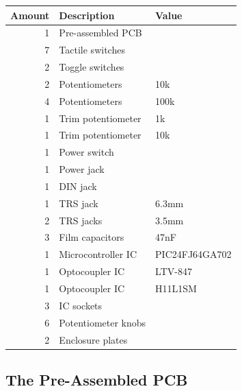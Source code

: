 \documentclass{scrartcl}
\begin{document}
\begin{center}
    \begin{tabular}{|r|l|l|}
        \hline
        \textbf{Amount} & \textbf{Description} & \textbf{Value} \\
        \hline
        1               & Pre-assembled PCB    &                \\
        7               & Tactile switches     &                \\
        2               & Toggle switches      &                \\
        2               & Potentiometers       & 10k            \\
        4               & Potentiometers       & 100k           \\
        1               & Trim potentiometer   & 1k             \\
        1               & Trim potentiometer   & 10k            \\
        1               & Power switch         &                \\
        1               & Power jack           &                \\
        1               & DIN jack             &                \\
        1               & TRS jack             & 6.3mm          \\
        2               & TRS jacks            & 3.5mm          \\
        3               & Film capacitors      & 47nF           \\
        1               & Microcontroller IC   & PIC24FJ64GA702 \\
        1               & Optocoupler IC       & LTV-847        \\
        1               & Optocoupler IC       & H11L1SM        \\
        3               & IC sockets           &                \\
        6               & Potentiometer knobs  &                \\
        2               & Enclosure plates     &                \\
        \hline
    \end{tabular}
\end{center}

\subsection{The Pre-Assembled PCB}
\end{document}
